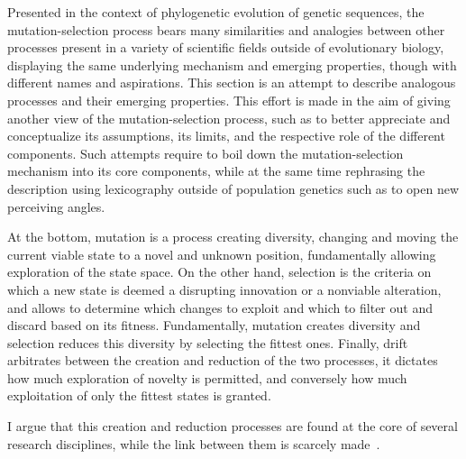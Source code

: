 Presented in the context of phylogenetic evolution of genetic sequences, the mutation-selection process bears many similarities and analogies between other processes present in a variety of scientific fields outside of evolutionary biology, displaying the same underlying mechanism and emerging properties, though with different names and aspirations.
This section is an attempt to describe analogous processes and their emerging properties.
This effort is made in the aim of giving another view of the mutation-selection process, such as to better appreciate and conceptualize its assumptions, its limits, and the respective role of the different components.
Such attempts require to boil down the mutation-selection mechanism into its core components, while at the same time rephrasing the description using lexicography outside of population genetics such as to open new perceiving angles.

At the bottom, mutation is a process creating diversity, changing and moving the current viable state to a novel and unknown position, fundamentally allowing exploration of the state space.
On the other hand, selection is the criteria on which a new state is deemed a disrupting innovation or a nonviable alteration, and allows to determine which changes to exploit and which to filter out and discard based on its fitness.
Fundamentally, mutation creates diversity and selection reduces this diversity by selecting the fittest ones.
Finally, drift arbitrates between the creation and reduction of the two processes, it dictates how much exploration of novelty is permitted, and conversely how much exploitation of only the fittest states is granted.

I argue that this creation and reduction processes are found at the core of several research disciplines, while the link between them is scarcely made~\citep{Baeck1994, Eiben1998}.


